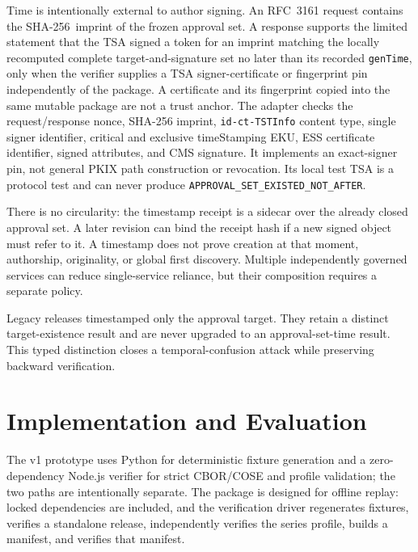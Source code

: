 \documentclass[conference,compsoc]{IEEEtran}
\newcommand{\sha}{\textsf{SHA-256}}
\begin{document}
Time is intentionally external to author signing. An RFC~3161 request contains
the \sha\ imprint of the frozen approval set. A response supports the limited
statement that the TSA signed a token for an imprint matching the locally
recomputed complete target-and-signature set no later than its recorded
\texttt{genTime}, only when the verifier supplies a TSA signer-certificate or
fingerprint pin independently of the package. A certificate and its fingerprint
copied into the same mutable package are not a trust anchor. The adapter checks
the request/response nonce, SHA-256 imprint, \texttt{id-ct-TSTInfo} content type,
single signer identifier, critical and exclusive timeStamping EKU, ESS
certificate identifier, signed attributes, and CMS signature. It implements an
exact-signer pin, not general PKIX path construction or revocation. Its local
test TSA is a protocol test and can never produce
\texttt{APPROVAL\_SET\_EXISTED\_NOT\_AFTER}.

There is no circularity: the timestamp receipt is a sidecar over the already
closed approval set. A later revision can bind the receipt hash if a new signed object
must refer to it. A timestamp does not prove creation at that moment,
authorship, originality, or global first discovery. Multiple independently
governed services can reduce single-service reliance, but their composition
requires a separate policy.

Legacy releases timestamped only the approval target. They retain a distinct
target-existence result and are never upgraded to an approval-set-time result.
This typed distinction closes a temporal-confusion attack while preserving
backward verification.

\section{Implementation and Evaluation}

The v1 prototype uses Python for deterministic fixture generation and a zero-dependency Node.js verifier for strict CBOR/COSE and profile validation; the two paths are intentionally separate. The package is designed for offline replay: locked dependencies are included, and the verification driver regenerates fixtures, verifies a standalone release, independently verifies the series profile, builds a manifest, and verifies that manifest.
\end{document}
